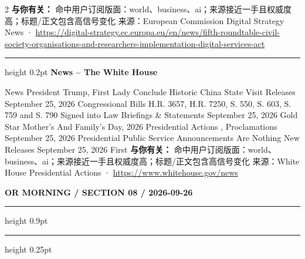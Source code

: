 \documentclass[10.5pt]{ctexart}
\begin{document}
\begin{multicols}{2}
\textbf{与你有关：} 命中用户订阅版面：world、business、ai；来源接近一手且权威度高；标题/正文包含高信号变化
{\footnotesize\color{ormuted} 来源：European Commission Digital Strategy News · \url{https://digital-strategy.ec.europa.eu/en/news/fifth-roundtable-civil-society-organisations-and-researchers-implementation-digital-services-act}}
\vspace{2mm}
\hrule height 0.2pt
\vspace{2mm}
{\large\bfseries News – The White House}\par
News President Trump, First Lady Conclude Historic China State Visit Releases September 25, 2026 Congressional Bills H.R. 3657, H.R. 7250, S. 550, S. 603, S. 759 and S. 790 Signed into Law Briefings \& Statements September 25, 2026 Gold Star Mother’s And Family’s Day, 2026 Presidential Actions , Proclamations September 25, 2026 Presidential Public Service Announcements Are Nothing New Releases September 25, 2026 First
\textbf{与你有关：} 命中用户订阅版面：world、business、ai；来源接近一手且权威度高；标题/正文包含高信号变化
{\footnotesize\color{ormuted} 来源：White House Presidential Actions · \url{https://www.whitehouse.gov/news}}
\end{multicols}
\newpage
{\small\bfseries OR MORNING / SECTION 08 / 2026-09-26}
\vspace{2mm}
\hrule height 0.9pt
\vspace{1.5mm}
\hrule height 0.25pt
\vspace{4mm}
\end{document}
